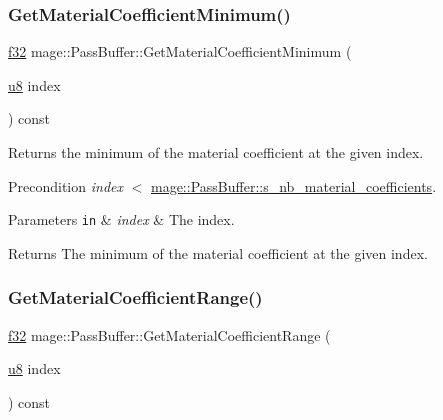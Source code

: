 \subsubsection{\texorpdfstring{Get\+Material\+Coefficient\+Minimum()}{GetMaterialCoefficientMinimum()}}
{\footnotesize\ttfamily \hyperlink{namespacemage_a6a44ad388483959dc4dff9f2aef91431}{f32} mage\+::\+Pass\+Buffer\+::\+Get\+Material\+Coefficient\+Minimum (\begin{DoxyParamCaption}\item[{\hyperlink{namespacemage_a5a362e2d56fc439362a80516ecae7828}{u8}}]{index }\end{DoxyParamCaption}) const\hspace{0.3cm}{\ttfamily [noexcept]}}

Returns the minimum of the material coefficient at the given index.

\begin{DoxyPrecond}{Precondition}
{\itshape index} $<$ \hyperlink{structmage_1_1_pass_buffer_a453e18abdf29c4ebb08d9e002a952bf2}{mage\+::\+Pass\+Buffer\+::s\+\_\+nb\+\_\+material\+\_\+coefficients}. 
\end{DoxyPrecond}

\begin{DoxyParams}[1]{Parameters}
\mbox{\tt in}  & {\em index} & The index. \\
\hline
\end{DoxyParams}
\begin{DoxyReturn}{Returns}
The minimum of the material coefficient at the given index. 
\end{DoxyReturn}
\hypertarget{structmage_1_1_pass_buffer_a413f445bbb3db1201705fab10305d052}{}\label{structmage_1_1_pass_buffer_a413f445bbb3db1201705fab10305d052} 
\subsubsection{\texorpdfstring{Get\+Material\+Coefficient\+Range()}{GetMaterialCoefficientRange()}}
{\footnotesize\ttfamily \hyperlink{namespacemage_a6a44ad388483959dc4dff9f2aef91431}{f32} mage\+::\+Pass\+Buffer\+::\+Get\+Material\+Coefficient\+Range (\begin{DoxyParamCaption}\item[{\hyperlink{namespacemage_a5a362e2d56fc439362a80516ecae7828}{u8}}]{index }\end{DoxyParamCaption}) const\hspace{0.3cm}{\ttfamily [noexcept]}}

